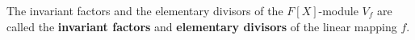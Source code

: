 The invariant factors and the elementary divisors of the $F[X]$-module $V_f$ are called the \textbf{invariant factors} and \textbf{elementary divisors} of the linear mapping $f$.
